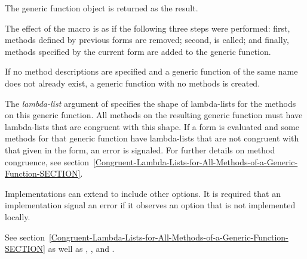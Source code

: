 \begin{defmac}
The generic function object is returned as the result. 


The effect of the  macro is as if the following three
steps were performed: first, methods defined by previous 
 forms are removed; second, 
is called; and finally, methods specified by the current 
 form are added to the generic function. 

If no method descriptions are specified and a generic function of the same
name does not already exist, a generic function with no methods is created.


The {\it lambda-list\/} argument of 
 specifies the shape of lambda-lists for the methods on
this generic function.  All methods on the resulting generic function must have
lambda-lists that are congruent with this shape.  If a 
 form is evaluated and some methods for that generic
function have lambda-lists that are not congruent with that given in
the  form, an error is signaled.  For further details
on method congruence,
see section~\ref{Congruent-Lambda-Lists-for-All-Methods-of-a-Generic-Function-SECTION}.

Implementations can extend  to include other options.
It is required that an implementation signal an error if
it observes an option that is not implemented locally.

See section~\ref{Congruent-Lambda-Lists-for-All-Methods-of-a-Generic-Function-SECTION}
as well as , , and .
\end{defmac}


